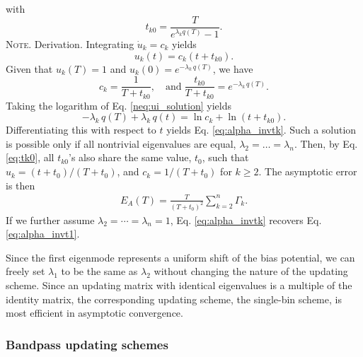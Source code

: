 \documentclass[reprint, superscriptaddress, floatfix]{revtex4-1}
\newcommand{\note}[1]{{\color{DarkGreen}\footnotesize \textsc{Note.} #1}}
\newcommand{\Err}{E}
\begin{document}
with
\begin{equation}
  t_{k0} = \frac{             T            }
                { e^{ \lambda_k q(T) } - 1 }.
\label{eq:tk0}
\end{equation}
%
\note{Derivation.
  Integrating $\dot u_k = c_k$ yields
  \begin{equation}
    u_k(t) = c_k \left(t + t_{k0} \right).
  \tag{UK}
  \label{neq:ui_solution}
  \end{equation}
  Given that $u_k(T) = 1$ and $u_k(0) = e^{-\lambda_k \, q(T)}$,
  we have
  $$
  c_k = \frac{ 1 }{ T + t_{k0} },
  \quad
  \mathrm{and\;}
  \frac{ t_{k0} } { T + t_{k0} }
  =
  e^{ -\lambda_k \, q(T) }.
  $$
  Taking the logarithm of Eq. \eqref{neq:ui_solution} yields
  $$
  -\lambda_k \, q(T) + \lambda_k \, q(t)
  = \ln c_k + \ln \left( t + t_{k0} \right).
  $$
  Differentiating this with respect to $t$ yields
  Eq. \eqref{eq:alpha_invtk}.
}
%
Such a solution is possible only if
all nontrivial eigenvalues are equal,
%
$\lambda_2 = \dots = \lambda_n$.
%
Then, by Eq. \eqref{eq:tk0},
all $t_{k0}$'s also share the same value,
$t_0$,
such that
$u_k = (t + t_0) / (T + t_0)$,
and
$c_k = 1/(T + t_0)$
for $k \ge 2$.
%
The asymptotic error is then
%
\begin{align}
  \Err_A(T)
  =
  \frac{       T     }
       { (T + t_0)^2 }
  \sum_{ k = 2 }^n
    \Gamma_k
  .
\label{eq:error_asym_singlebin}
\end{align}
%
If we further assume $\lambda_2 = \cdots = \lambda_n = 1$,
Eq. \eqref{eq:alpha_invtk}
recovers Eq. \eqref{eq:alpha_invt1}.
%

Since the first eigenmode represents
a uniform shift of the bias potential,
we can freely set $\lambda_1$ to be the same as $\lambda_2$
without changing the nature of the updating scheme.
%
Since an updating matrix
with identical eigenvalues
is a multiple of the identity matrix,
%
the corresponding updating scheme,
the single-bin scheme, is most efficient
in asymptotic convergence.
%



\subsubsection{\label{sec:optscheme}
Bandpass updating schemes}
\end{document}
